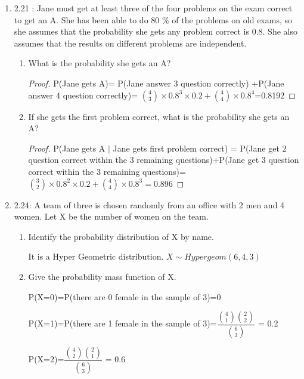 \documentclass[11pt, oneside]{article}
\begin{document}
\begin{enumerate}
\begin{enumerate}
        \item 2.21 :
            Jane must get at least three of the four problems on the exam correct to get an A. She has been able to do 80 $\% $ of the problems on old exams, so she assumes that the probability she gets any problem correct is 0.8. She also assumes that the results on different problems are independent.
            \begin{enumerate}
                \item What is the probability she gets an A?
                \begin{proof}
                P(Jane gets A)= P(Jane answer 3 question correctly) +P(Jane answer 4 question correctly)= ${4\choose 3}\times 0.8^3\times 0.2+{4\choose 4}\times 0.8^4$=0.8192
                \end{proof}
                \item If she gets the first problem correct, what is the probability she gets an A?
                \begin{proof}
                P(Jane gets A $|$ Jane gets first problem correct) = P(Jane get 2 question correct within the 3 remaining questions)+P(Jane get 3 question correct within the 3 remaining questions)= ${3\choose 2}\times 0.8^2\times 0.2+{4\choose 4}\times 0.8^3=0.896$
                \end{proof}
            \end{enumerate}
        
        \item 2.24:
        A team of three is chosen randomly from an office with 2 men and 4 women. Let X be the number of women on the team.
        
        \begin{enumerate}
            \item Identify the probability distribution of X by name.
            
            It is a Hyper Geometric distribution. $X\sim Hypergeom(6, 4,3)$
            
            \item Give the probability mass function of X.
            
            P(X=0)=P(there are 0 female in the sample of 3)=0
            
            P(X=1)=P(there are 1 female in the sample of 3)=$\dfrac{{4\choose  1 } {2  \choose 2}}{{6\choose 3}}$ = 0.2
            
            P(X=2)=$\dfrac{{4\choose  2 } {2  \choose 1}}{{6\choose 3}}$ = 0.6
            

\end{enumerate}
\end{enumerate}
\end{enumerate}
\end{document}
